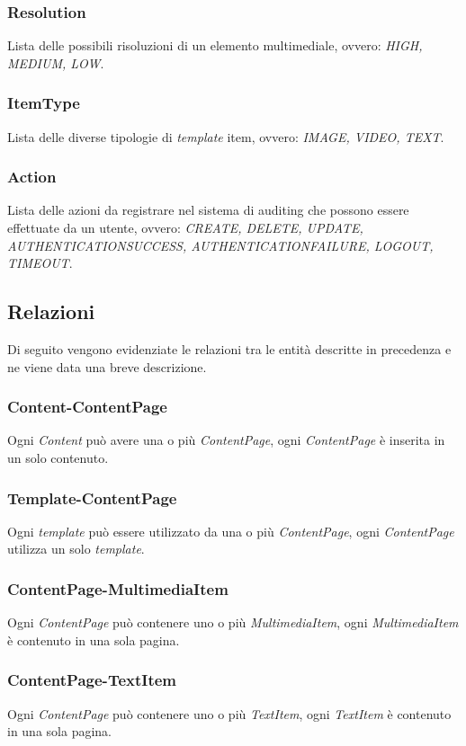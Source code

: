 \subsubsection{Resolution}
Lista delle possibili risoluzioni di un elemento multimediale, ovvero: \textit{HIGH, MEDIUM, LOW}.

\subsubsection{ItemType}
Lista delle diverse tipologie di \textit{template} item, ovvero: \textit{IMAGE, VIDEO, TEXT}.

\subsubsection{Action}
Lista delle azioni da registrare nel sistema di auditing che possono essere effettuate da un utente, ovvero: \textit{CREATE, DELETE, UPDATE, AUTHENTICATION\textunderscore{}SUCCESS, AUTHENTICATION\textunderscore{}FAILURE, LOGOUT, TIMEOUT}.

\subsection{Relazioni}
\label{rel}
Di seguito vengono evidenziate le relazioni tra le entità descritte in precedenza e ne viene data una breve descrizione.
\subsubsection{Content-ContentPage}
Ogni \textit{Content} può avere una o più \textit{ContentPage}, ogni \textit{ContentPage} è inserita in un solo contenuto.
\subsubsection{Template-ContentPage}
Ogni \textit{template} può essere utilizzato da una o più \textit{ContentPage}, ogni \textit{ContentPage} utilizza un solo \textit{template}.
\subsubsection{ContentPage-MultimediaItem}
Ogni \textit{ContentPage} può contenere uno o più \textit{MultimediaItem}, ogni \textit{MultimediaItem} è contenuto in una sola pagina.
\subsubsection{ContentPage-TextItem}
Ogni \textit{ContentPage} può contenere uno o più \textit{TextItem}, ogni \textit{TextItem} è contenuto in una sola pagina.
